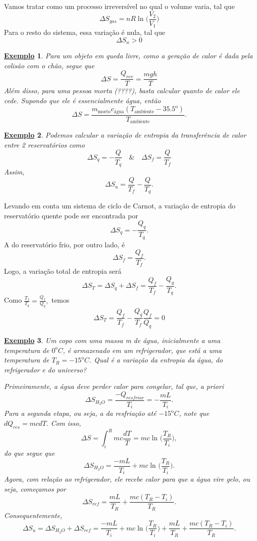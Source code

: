 \documentclass{article}
\newtheorem{example}{\underline{Exemplo}}
\begin{document}
  Vamos tratar como um processo irreversível no qual o volume varia, tal que 
  \[
    \Delta S_{gas} = nR\ln^{}{\biggl(\frac{V_{2}}{V_{1}}\biggr)}
  \]
  Para o resto do sistema, essa variação é nula, tal que 
  \[
    \Delta S_{u} > 0
  \]
\begin{example}
  Para um objeto em queda livre, como a geração de calor é dada pela colisão com o chão, segue que 
  \[
    \Delta S = \frac{Q_{rev}}{T} = \frac{mgh}{T}
  \]
  Além disso, para uma pessoa morta (????), basta calcular quanto de calor ele cede. Supondo que ele é essencialmente
água, então 
  \[
    \Delta S = \frac{m_{\text{morto}}c_{\text{água}}(T_{\text{ambiente}}-35.5^{\mathrm{o}})}{T_{\text{ambiente}}}.
  \]
\end{example}
\begin{example}
  Podemos calcular a variação de entropia da transferência de calor entre 2 reservatórios como 
  \[
    \Delta S_{q} = -\frac{Q}{T_{q}}\quad\&\quad \Delta S_{f} = \frac{Q}{T_{f}}
  \]
  Assim, 
  \[
    \Delta S_{u} = \frac{Q}{T_{f}} - \frac{Q}{T_{q}}.
  \]
\end{example}
  Levando em conta um sistema de ciclo de Carnot, a variação de entropia do reservatório quente pode ser encontrada por 
  \[
    \Delta S_{q} = -\frac{Q_{q}}{T_{q}}.
  \]
  A do reservatório frio, por outro lado, é 
  \[
    \Delta S_{f} = \frac{Q_{f}}{T_{f}}.
  \]
  Logo, a variação total de entropia será 
  \[
    \Delta S_{T} = \Delta S_{q} + \Delta S_{f} = \frac{Q_{f}}{T_{f}} - \frac{Q_{q}}{T_{q}}.
  \]
  Como \(\frac{T_{f}}{T_{q}} = \frac{Q_{f}}{Q_{q}},\) temos 
  \[
    \Delta S_{T} = \frac{Q_{f}}{T_{f}} - \frac{Q_{q}}{T_{f}}\frac{Q_{f}}{Q_{q}} = 0
  \]
\begin{example}
  Um copo com uma massa m de água, inicialmente a uma temperatura de \({0}^{\mathrm{o}}C\), é armazenado em um refrigerador, que está a uma temperatura
de \(T_{R}={-15}^{\mathrm{o}}C\). Qual é a variação da entropia da água, do refrigerador e do universo?

  Primeiramente, a água deve perder calor para congelar, tal que, a priori 
  \[
    \Delta S_{H_{2}O} = \frac{-Q_{resfriar}}{T_{i}} = -\frac{mL}{T_{i}}.
  \]
  Para a segunda etapa, ou seja, a da resfriação até \({-15}^{\mathrm{o}}C\), note que \(dQ_{res} = mcdT.\) Com isso, 
  \[
    \Delta S = \int_{i}^{R}mc \frac{dT}{T} = mc \ln^{}{\biggl(\frac{T_{R}}{T_{i}}\biggr)},
  \]
  do que segue que 
  \[
    \Delta S_{H_{2}O} = \frac{-mL}{T_{i}} + mc\ln^{}{\biggl(\frac{T_{R}}{T_{i}}\biggr)}.
  \]
  Agora, com relação ao refrigerador, ele recebe calor para que a água vire gelo, ou seja, começamos por 
  \[
    \Delta S_{ref} = \frac{mL}{T_{R}} + \frac{mc(T_{R}-T_{i})}{T_{R}}.
  \]
  Consequentemente, 
  \[
    \Delta S_{u} = \Delta S_{H_{2}O} + \Delta S_{ref} = \frac{-mL}{T_{i}} + mc\ln^{}{\biggl(\frac{T_{R}}{T_{i}}\biggr)} + \frac{mL}{T_{R}} + \frac{mc(T_{R}-T_{i})}{T_{R}}.
  \]
\end{example}
\end{document}
